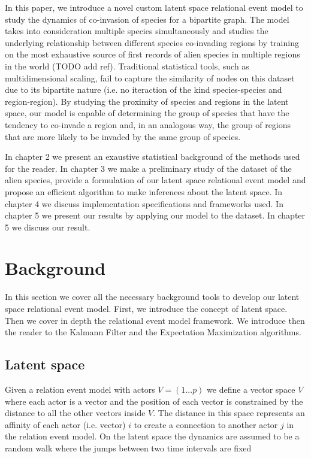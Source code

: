 \documentclass[mscthesis]{usiinfthesis}
\begin{document}
In this paper, we introduce a novel custom latent space relational event model to study the dynamics of co-invasion of species for a bipartite graph. The model takes into consideration multiple species simultaneously and studies the underlying relationship between different species co-invading regions by training on the most exhaustive source of first records of alien species in multiple regions in the world (TODO add ref). Traditional statistical tools, such as multidimensional scaling, fail to capture the similarity of nodes on this dataset due to its bipartite nature (i.e. no iteraction of the kind species-species and region-region). By studying the proximity of species and regions in the latent space, our model is capable of determining the group of species that have the tendency to co-invade a region and, in an analogous way, the group of regions that are more likely to be invaded by the same group of species. 

In chapter 2 we present an exaustive statistical background of the methods used for the reader. In chapter 3 we make a preliminary study of the  dataset of the alien species, provide a formulation of our latent space relational event model and propose an efficient algorithm to make inferences about the latent space. In chapter 4 we discuss implementation specifications and frameworks used. In chapter 5 we present our results by applying our model to the dataset. In chapter 5 we discuss our result.

\chapter{Background}

In this section we cover all the necessary background tools to develop our latent space relational event model. First, we introduce the concept of latent space. Then we cover in depth the relational event model framework. We introduce then the reader to the Kalmann Filter and the Expectation Maximization algorithms. 

\section{Latent space}
Given a relation event model with actors $V=(1...p)$ we define a vector space $V$ where each actor is a vector and the position of each vector is constrained by the distance to all the other vectors inside $V$. The distance in this space represents an affinity of each actor (i.e. vector) $i$ to create a connection to another actor $j$ in the relation event model. On the latent space the dynamics are assumed to be a random walk where the jumps between two time intervals are fixed
\end{document}
